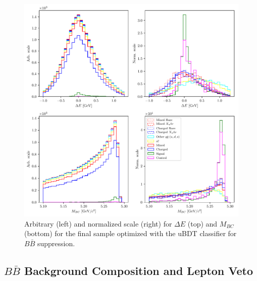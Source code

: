 \begin{figure}[H]
	\centering
	\captionsetup{width=0.8\linewidth}
	\includegraphics[width=\linewidth]{fig/opt_uBB}
	\caption{Arbitrary (left) and normalized scale (right) for $\Delta E$ (top) and $M_{BC}$ (bottom) for the final sample optimized with the uBDT classifier for $B \bar B$ suppression.}
	\label{fig:opt1dc}
\end{figure} 

\subsection{\texorpdfstring{$B \bar B$}{BB-bar} Background Composition and Lepton Veto}

